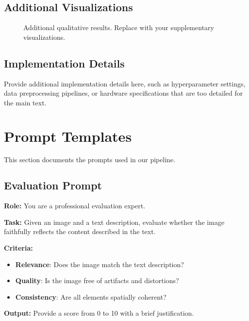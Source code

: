 \subsection{Additional Visualizations}

\begin{figure}[h!]
  \centering
  \fbox{\rule{0pt}{1.5in}\rule{0.9\linewidth}{0pt}}
  \caption{Additional qualitative results. Replace with your supplementary visualizations.}
  \label{fig:additional_vis}
\end{figure}

\subsection{Implementation Details}

Provide additional implementation details here, such as hyperparameter settings, data preprocessing pipelines, or hardware specifications that are too detailed for the main text.

\section{Prompt Templates}
\label{sec:prompt_templates}

This section documents the prompts used in our pipeline.

\subsection{Evaluation Prompt}

\begin{promptbox}
\noindent\textbf{Role:} You are a professional evaluation expert.

\noindent\textbf{Task:} Given an image and a text description, evaluate whether the image faithfully reflects the content described in the text.

\noindent\textbf{Criteria:}
\begin{itemize}[leftmargin=1.5em,itemsep=1pt,topsep=2pt]
  \item \textbf{Relevance}: Does the image match the text description?
  \item \textbf{Quality}: Is the image free of artifacts and distortions?
  \item \textbf{Consistency}: Are all elements spatially coherent?
\end{itemize}

\noindent\textbf{Output:} Provide a score from 0 to 10 with a brief justification.
\end{promptbox}

